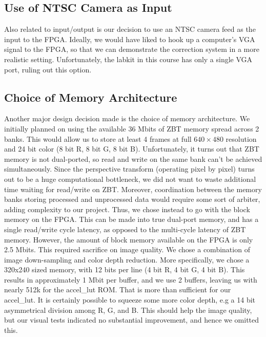 \documentclass{article}
\begin{document}
\subsection{Use of NTSC Camera as Input}
Also related to input/output is our decision to use an NTSC camera feed as the input to the FPGA.
Ideally, we would have liked to hook up a computer's VGA signal to the FPGA, so that we can demonstrate the correction system in a more realistic setting.
Unfortunately, the labkit in this course has only a single VGA port, ruling out this option.

\subsection{Choice of Memory Architecture}
Another major design decision made is the choice of memory architecture.
We initially planned on using the available 36 Mbits of ZBT memory spread across 2 banks.
This would allow us to store at least 4 frames at full $640 \times 480$  resolution and 24 bit color (8 bit R, 8 bit G, 8 bit B).
Unfortunately, it turns out that ZBT memory is not dual-ported, so read and write on the same bank can't be achieved simultaneously.
Since the perspective transform (operating pixel by pixel) turns out to be a huge computational bottleneck,
we did not want to waste additional time waiting for read/write on ZBT.
Moreover, coordination between the memory banks storing processed and unprocessed data would require some sort of arbiter, adding complexity to our project.
Thus, we chose instead to go with the block memory on the FPGA.
This can be made into true dual-port memory, and has a single read/write cycle latency, as opposed to the multi-cycle latency of ZBT memory.
However, the amount of block memory available on the FPGA is only 2.5 Mbits.
This required sacrifice on image quality.
We chose a combination of image down-sampling and color depth reduction.
More specifically, we chose a 320x240 sized memory, with 12 bits per line (4 bit R, 4 bit G, 4 bit B).
This results in approximately 1 Mbit per buffer, and we use 2 buffers, leaving us with nearly 512k for the accel\_lut ROM.
That is more than sufficient for our accel\_lut.
It is certainly possible to squeeze some more color depth, e.g a 14 bit asymmetrical division among R, G, and B.
This should help the image quality, but our visual tests indicated no substantial improvement, and hence we omitted this.
\end{document}

